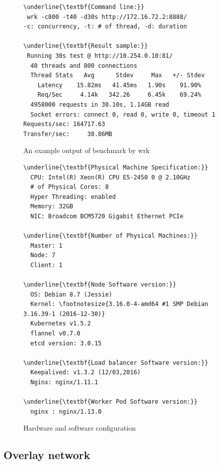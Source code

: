 \begin{figure}
\begin{minipage}{\columnwidth}
\small
\begin{Verbatim}[commandchars=\\\{\}]
\underline{\textbf{Command line:}}
 wrk -c800 -t40 -d30s http://172.16.72.2:8888/
-c: concurrency, -t: # of thread, -d: duration

\underline{\textbf{Result sample:}}
 Running 30s test @ http://10.254.0.10:81/
  40 threads and 800 connections
  Thread Stats   Avg      Stdev     Max   +/- Stdev
    Latency    15.82ms   41.45ms   1.90s    91.90%
    Req/Sec     4.14k   342.26     6.45k    69.24%
  4958000 requests in 30.10s, 1.14GB read
  Socket errors: connect 0, read 0, write 0, timeout 1
Requests/sec: 164717.63
Transfer/sec:     38.86MB
\end{Verbatim}
\end{minipage}
\caption{An example output of benchmark by wrk}
\label{fig:benchmark example}
\end{figure}

\begin{figure}
\begin{minipage}{0.9\columnwidth}
\small
\begin{Verbatim}[commandchars=\\\{\}]
\underline{\textbf{Physical Machine Specification:}}
  CPU: Intel(R) Xeon(R) CPU E5-2450 0 @ 2.10GHz
  # of Physical Cores: 8
  Hyper Threading: enabled
  Memory: 32GB
  NIC: Broadcom BCM5720 Gigabit Ethernet PCIe

\underline{\textbf{Number of Physical Machines:}}
  Master: 1
  Node: 7
  Client: 1

\underline{\textbf{Node Software version:}}
  OS: Debian 8.7 (Jessie)
  Kernel: \footnotesize{3.16.0-4-amd64 #1 SMP Debian 3.16.39-1 (2016-12-30)}
  Kubernetes v1.5.2
  flannel v0.7.0
  etcd version: 3.0.15

\underline{\textbf{Load balancer Software version:}}
  Keepalived: v1.3.2 (12/03,2016)
  Nginx: nginx/1.11.1

\underline{\textbf{Worker Pod Software version:}}
  nginx : nginx/1.13.0 
\end{Verbatim}
\end{minipage}
\caption{Hardware and software configuration}
\label{fig:Hardware and software configuration}
\end{figure}


\subsection{Overlay network}

